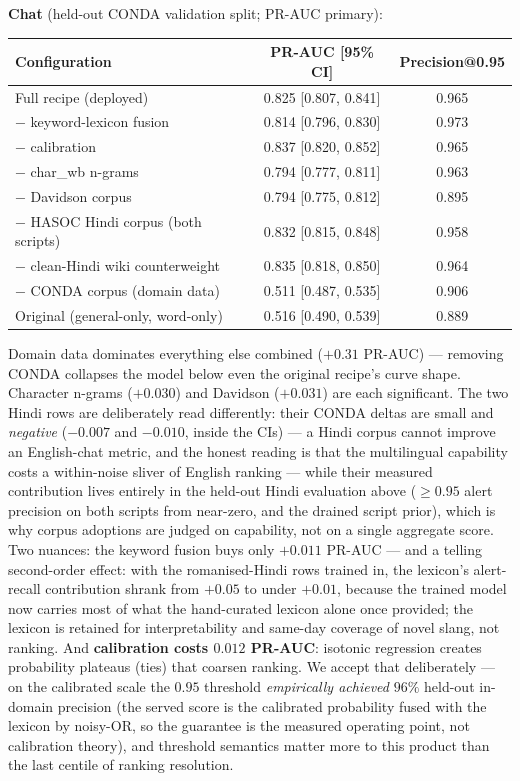 \documentclass[11pt,a4paper]{article}
\begin{document}
\textbf{Chat} (held-out CONDA validation split; PR-AUC primary):
\begin{center}
\begin{tabular}{lcc}
\toprule
\textbf{Configuration} & \textbf{PR-AUC [95\% CI]} & \textbf{Precision@0.95} \\
\midrule
Full recipe (deployed)            & 0.825 [0.807, 0.841] & 0.965 \\
$-$ keyword-lexicon fusion        & 0.814 [0.796, 0.830] & 0.973 \\
$-$ calibration                   & 0.837 [0.820, 0.852] & 0.965 \\
$-$ char\_wb n-grams              & 0.794 [0.777, 0.811] & 0.963 \\
$-$ Davidson corpus               & 0.794 [0.775, 0.812] & 0.895 \\
$-$ HASOC Hindi corpus (both scripts) & 0.832 [0.815, 0.848] & 0.958 \\
$-$ clean-Hindi wiki counterweight & 0.835 [0.818, 0.850] & 0.964 \\
$-$ CONDA corpus (domain data)    & 0.511 [0.487, 0.535] & 0.906 \\
Original (general-only, word-only) & 0.516 [0.490, 0.539] & 0.889 \\
\bottomrule
\end{tabular}
\end{center}
Domain data dominates everything else combined ($+0.31$ PR-AUC) --- removing CONDA
collapses the model below even the original recipe's curve shape. Character n-grams
($+0.030$) and Davidson ($+0.031$) are
each significant. The two Hindi rows are deliberately read differently: their
CONDA deltas are small and \emph{negative} ($-0.007$ and $-0.010$, inside the
CIs) --- a Hindi corpus cannot improve an English-chat metric, and the honest
reading is that the multilingual capability costs a within-noise sliver of
English ranking --- while their measured contribution lives entirely in the
held-out Hindi evaluation above ($\geq$$0.95$ alert precision on both scripts
from near-zero, and the drained script prior), which is
why corpus adoptions are judged on capability, not on a single aggregate score.
Two nuances: the keyword fusion buys only $+0.011$ PR-AUC --- and a telling
second-order effect: with the romanised-Hindi rows trained in, the lexicon's
alert-recall contribution shrank from $+0.05$ to under $+0.01$, because the
trained model now carries most of what the hand-curated lexicon alone once
provided; the lexicon is retained for interpretability and same-day coverage of
novel slang, not ranking. And
\textbf{calibration costs $0.012$ PR-AUC}: isotonic regression creates probability
plateaus (ties) that coarsen ranking. We accept that deliberately --- on the
calibrated scale the $0.95$ threshold \emph{empirically achieved} $96\%$ held-out
in-domain precision (the served score is the calibrated probability fused with the
lexicon by noisy-OR, so the guarantee is the measured operating point, not
calibration theory), and threshold
semantics matter more to this product than the last centile of ranking resolution.
\end{document}
